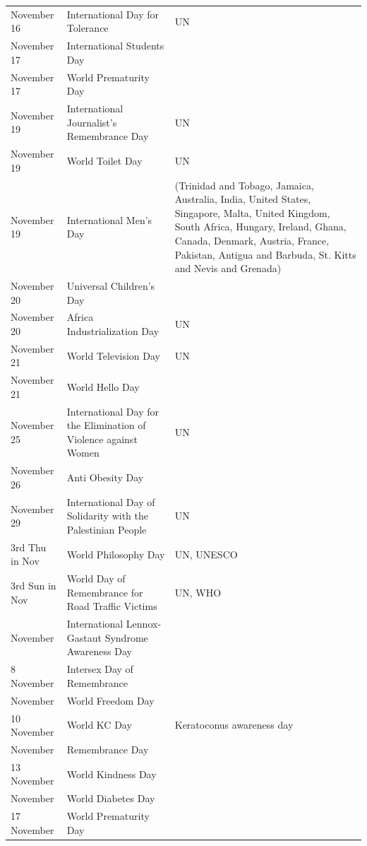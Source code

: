 \documentclass[
  openany]{book}
\begin{document}
\begin{longtable}[t]{>{\raggedright\arraybackslash}p{8em}>{\raggedright\arraybackslash}p{18em}>{\raggedright\arraybackslash}p{10em}}
\rowcolor{gray!6}  November 16 & International Day for Tolerance & UN\\
November 17 & International Students Day & \\
\addlinespace
\rowcolor{gray!6}  November 17 & World Prematurity Day & \\
November 19 & International Journalist's Remembrance Day & UN\\
\rowcolor{gray!6}  November 19 & World Toilet Day & UN\\
November 19 & International Men's Day & (Trinidad and Tobago, Jamaica, Australia, India, United States, Singapore, Malta, United Kingdom, South Africa, Hungary, Ireland, Ghana, Canada, Denmark, Austria, France, Pakistan, Antigua and Barbuda, St. Kitts and Nevis and Grenada)\\
\rowcolor{gray!6}  November 20 & Universal Children's Day & \\
\addlinespace
November 20 & Africa Industrialization Day & UN\\
\rowcolor{gray!6}  November 21 & World Television Day & UN\\
November 21 & World Hello Day & \\
\rowcolor{gray!6}  November 25 & International Day for the Elimination of Violence against Women & UN\\
November 26 & Anti Obesity Day & \\
\addlinespace
\rowcolor{gray!6}  November 29 & International Day of Solidarity with the Palestinian People & UN\\
3rd Thu in Nov & World Philosophy Day & UN, UNESCO\\
\rowcolor{gray!6}  3rd Sun in Nov & World Day of Remembrance for Road Traffic Victims & UN, WHO\\
1 November & International Lennox-Gastaut Syndrome Awareness Day & \\
\rowcolor{gray!6}  8 November & Intersex Day of Remembrance & \\
\addlinespace
9 November & World Freedom Day & \\
\rowcolor{gray!6}  10 November & World KC Day & Keratoconus awareness day\\
11 November & Remembrance Day & \\
\rowcolor{gray!6}  13 November & World Kindness Day & \\
14 November & World Diabetes Day & \\
\addlinespace
\rowcolor{gray!6}  17 November & World Prematurity Day & \\

\end{longtable}
\end{document}
